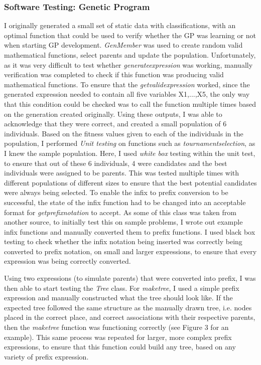 \documentclass[11pt]{article}
\begin{document}
\subsubsection{Software Testing: Genetic Program}
I originally generated a small set of static data with classifications, with an optimal function that could be used to verify whether the GP was learning or not when starting GP development.
\textit{GenMember} was used to create random valid mathematical functions, select parents and update the population. Unfortunately, as it was very difficult to test whether \textit{generate\textunderscore expression} was working, manually verification was completed to check if this function was producing valid mathematical functions. To ensure that the \textit{get\textunderscore valid\textunderscore expression} worked, since the generated expression needed to contain all five variables X1,...,X5, the only way that this condition could be checked was to call the function multiple times based on the generation created originally. Using these outputs, I was able to acknowledge that they were correct, and created a small population of 6 individuals. Based on the fitness values given to each of the individuals in the population, I performed \textit{Unit testing} on functions such as \textit{tournament\textunderscore selection}, as I knew the sample population. Here, I used \textit{white box} testing within the unit test, to ensure that out of these 6 individuals, 4 were candidates and the best individuals were assigned to be parents. This was tested multiple times with different populations of different sizes to ensure that the best potential candidates were always being selected. 
To enable the infix to prefix conversion to be successful, the state of the infix function had to be changed into an acceptable format for \textit{get\textunderscore prefix\textunderscore notation} to accept. As some of this class was taken from another source, to initially test this on sample problems, I wrote out example infix functions and manually converted them to prefix functions. I used black box testing to check whether the infix notation being inserted was correctly being converted to prefix notation, on small and larger expressions, to ensure that every expression was being correctly converted. 

Using two expressions (to simulate parents) that were converted into prefix, I was then able to start testing the \textit{Tree} class. For \textit{make\textunderscore tree}, I used a simple prefix expression
and manually constructed what the tree should look like. If the expected tree followed the same structure as the manually drawn tree, i.e. nodes placed in the correct place, and correct associations with their respective parents, then the \textit{make\textunderscore tree} function was functioning correctly (see Figure 3 for an example).  This same process was repeated for larger, more complex prefix expressions, to ensure that this function could build any tree, based on any variety of prefix expression.  
\end{document}
